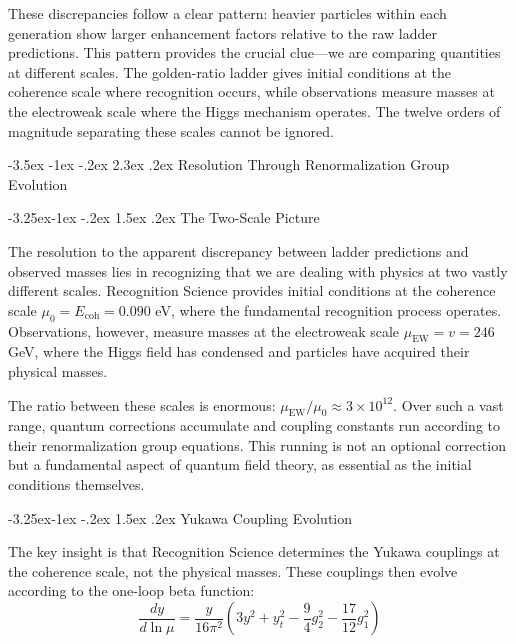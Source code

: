 \documentclass[11pt,a4paper]{article}
\makeatletter
\renewcommand\section{\@startsection{section}{1}{\z@}%
  {-3.5ex \@plus -1ex \@minus -.2ex}%
  {2.3ex \@plus.2ex}%
  {\normalfont\Large\bfseries\color{darkblue}}}
\renewcommand\subsection{\@startsection{subsection}{2}{\z@}%
  {-3.25ex\@plus -1ex \@minus -.2ex}%
  {1.5ex \@plus .2ex}%
  {\normalfont\large\bfseries\color{darkblue}}}
\theoremstyle{definition}
\newcommand{\Ecoh}{E_{\text{coh}}}
\newcommand{\muEW}{\mu_{\text{EW}}}
\makeatother
\begin{document}
These discrepancies follow a clear pattern: heavier particles within each generation show larger enhancement factors relative to the raw ladder predictions. This pattern provides the crucial clue—we are comparing quantities at different scales. The golden-ratio ladder gives initial conditions at the coherence scale where recognition occurs, while observations measure masses at the electroweak scale where the Higgs mechanism operates. The twelve orders of magnitude separating these scales cannot be ignored.

\section{Resolution Through Renormalization Group Evolution}

\subsection{The Two-Scale Picture}

The resolution to the apparent discrepancy between ladder predictions and observed masses lies in recognizing that we are dealing with physics at two vastly different scales. Recognition Science provides initial conditions at the coherence scale $\mu_0 = \Ecoh = 0.090$ eV, where the fundamental recognition process operates. Observations, however, measure masses at the electroweak scale $\muEW = v = 246$ GeV, where the Higgs field has condensed and particles have acquired their physical masses.

The ratio between these scales is enormous: $\muEW/\mu_0 \approx 3 \times 10^{12}$. Over such a vast range, quantum corrections accumulate and coupling constants run according to their renormalization group equations. This running is not an optional correction but a fundamental aspect of quantum field theory, as essential as the initial conditions themselves.

\subsection{Yukawa Coupling Evolution}

The key insight is that Recognition Science determines the Yukawa couplings at the coherence scale, not the physical masses. These couplings then evolve according to the one-loop beta function:
\begin{equation}
\frac{dy}{d\ln\mu} = \frac{y}{16\pi^2}\left(3y^2 + y^2_t - \frac{9}{4}g_2^2 - \frac{17}{12}g_1^2\right)
\end{equation}
\end{document}
